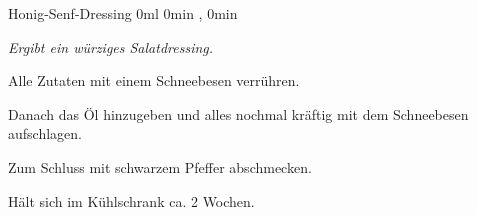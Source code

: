 \begin{recipe}{Honig-Senf-Dressing} {0ml} {0min , 0min }

  \freeform{}\textit{Ergibt ein würziges Salatdressing.}


  Alle Zutaten mit einem Schneebesen verrühren.


  Danach das Öl hinzugeben und alles nochmal kräftig mit dem Schneebesen aufschlagen.


  Zum Schluss mit schwarzem Pfeffer abschmecken.

  \freeform{}\hrulefill{}

  \freeform{}
  Hält sich im Kühlschrank ca. 2 Wochen.

\end{recipe}
